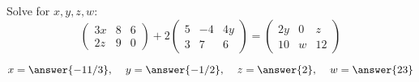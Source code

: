 \documentclass{ximera}
\author{Parisa Fatheddin}
\begin{document}
\begin{exercise}


Solve for $x, y, z, w$:
\[
\left(\begin{array}{ccc}
3x & 8 & 6\\
2z & 9 & 0
\end{array}\right) + 2 \left(\begin{array}{ccc} 
5& -4 & 4y\\
3 & 7 & 6
\end{array}\right) = \left(\begin{array}{ccc}
2y & 0 & z\\
10 & w & 12 
\end{array}\right)
\]
\begin{prompt}
\[
x = \answer{-11/3}, \hspace{.4cm} y = \answer{-1/2}, \hspace{.4cm} z = \answer{2}, \hspace{.4cm} w = \answer{23}
\]
\end{prompt}



















\end{exercise}
\end{document}
